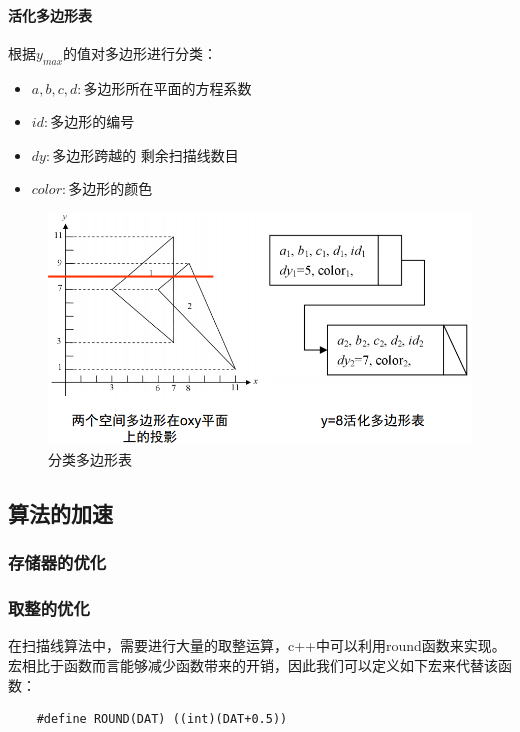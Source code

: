 \documentclass[10pt]{article}
\begin{document}
\paragraph{活化多边形表}
根据$y_{max}$的值对多边形进行分类：
\begin{itemize}
\item{$a,b,c,d:$多边形所在平面的方程系数}
\item{$id:$多边形的编号}
\item{$dy:$多边形跨越的{\color{red} 剩余}扫描线数目}
\item{$color:$多边形的颜色}
\end{itemize}
\begin{figure}[H]
\setlength{\abovecaptionskip}{2pt}
\begin{center}
\includegraphics[scale=0.4]{structure1.png}
\end{center}
\caption{分类多边形表}
\end{figure}



\subsection{算法的加速}
\subsubsection{存储器的优化}

\subsubsection{取整的优化}
在扫描线算法中，需要进行大量的取整运算，c++中可以利用round函数来实现。宏相比于函数而言能够减少函数带来的开销，因此我们可以定义如下宏来代替该函数：
\begin{lstlisting}
	#define ROUND(DAT) ((int)(DAT+0.5))
\end{lstlisting}
\end{document}
